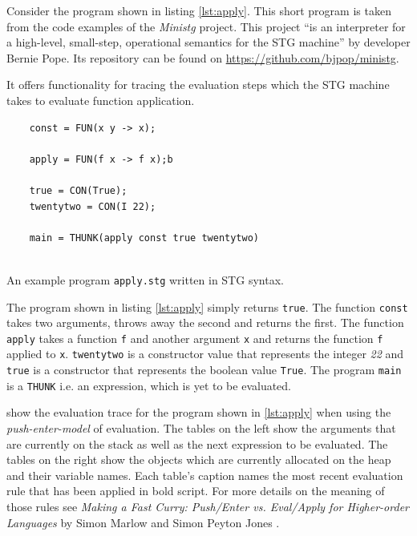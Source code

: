 \documentclass[runningheads]{llncs}
\begin{document}
Consider the program shown in listing \ref{lst:apply}. This short program is taken from the code examples of the \textit{Ministg} project. This project \enquote{is an interpreter for a high-level, small-step, operational semantics for the STG machine} by developer Bernie Pope. Its repository can be found on \url{https://github.com/bjpop/ministg}.

It offers functionality for tracing the evaluation steps which the STG machine takes to evaluate function application.

\begin{listing}[H]
	\begin{verbatim}
	const = FUN(x y -> x);
	
	apply = FUN(f x -> f x);b
	
	true = CON(True);
	twentytwo = CON(I 22);
	
	main = THUNK(apply const true twentytwo)
	
	\end{verbatim}
	\caption{An example program \texttt{apply.stg} written in STG syntax.}
	\label{lst:apply}
\end{listing}

The program shown in listing \ref{lst:apply} simply returns \texttt{true}. The function \texttt{const} takes two arguments, throws away the second and returns the first. The function \texttt{apply} takes a function \texttt{f} and another argument \texttt{x} and returns the function \texttt{f} applied to \texttt{x}. \texttt{twentytwo} is a constructor value that represents the integer \textit{22} and \texttt{true} is a constructor that represents the boolean value \texttt{True}. The program \texttt{main} is a \texttt{THUNK} i.e. an expression, which is yet to be evaluated.



 show the evaluation trace for the program shown in \cref{lst:apply} when using the \textit{push-enter-model} of evaluation.
The tables on the left show the arguments that are currently on the stack as well as the next expression to be evaluated. The tables on the right show the objects which are currently allocated on the heap and their variable names. Each table's caption names the most recent evaluation rule that has been applied in bold script. For more details on the meaning of those rules see \textit{Making a Fast Curry: Push/Enter vs. Eval/Apply for Higher-order Languages} by Simon Marlow and Simon Peyton Jones \cite{marlow2004making}.
\end{document}
